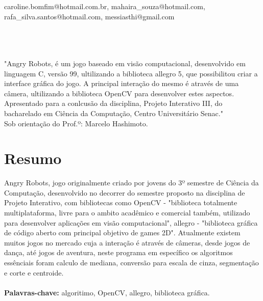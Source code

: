 \documentclass[a4paper]{article}
\title{\normalfont\spacedallcaps{Projeto Interativo III  Angry Robots}}
\author{Carolina Bomfim, Mahaira Soares de Souza, \\ Rafael da Silva Santos e Thiago Messias }
\date{}
\begin{document}
\pagestyle{scrheadings} 


\maketitle

{\large caroline.bomfim@hotmail.com.br, mahaira\_souza@hotmail.com, rafa\_silva.santos@hotmail.com, messiasthi@gmail.com}
\\
\\
\\
\\

\hspace{0.45\textwidth} 
   \begin{minipage}{.5\textwidth}
   \large "Angry Robots, é um jogo baseado em visão computacional, desenvolvido em linguagem C, versão 99, ultilizando a biblioteca allegro 5, que possibilitou criar a interface gráfica do jogo. A principal interação do mesmo é através de uma câmera, ultilizando a biblioteca OpenCV para desenvolver estes aspectos. Apresentado para a conlcusão da disciplina, Projeto Interativo III, do bacharelado em Ciência da Computação, Centro Universitário Senac."\\[0.1cm]
			Sob orientação do Prof.º: Marcelo Hashimoto.
  \end{minipage}
  \vfill

\vspace{1cm}


\section*{Resumo}

Angry Robots, jogo originalmente criado por jovens do 
3º semestre de Ciência da Computação, desenvolvido no decorrer do semestre
proposto na disciplina de Projeto Interativo, com bibliotecas como
OpenCV - "biblioteca totalmente multiplataforma, livre para o
ambito acadêmico e comercial também, utilizado para desenvolver
aplicações em visão computacional", allegro - "biblioteca gráfica
de código aberto com principal objetivo de games 2D". Atualmente
existem muitos jogos no mercado cuja a interação é através de
câmeras, desde jogos de dança, até jogos de aventura, neste
programa em específico os algoritmos essênciais foram calculo de
mediana, conversão para escala de cinza, segmentação e corte e
centroide.\\
\\
{\bf Palavras-chave:} algoritimo, OpenCV, allegro, biblioteca gráfica.
\\
\end{document}

